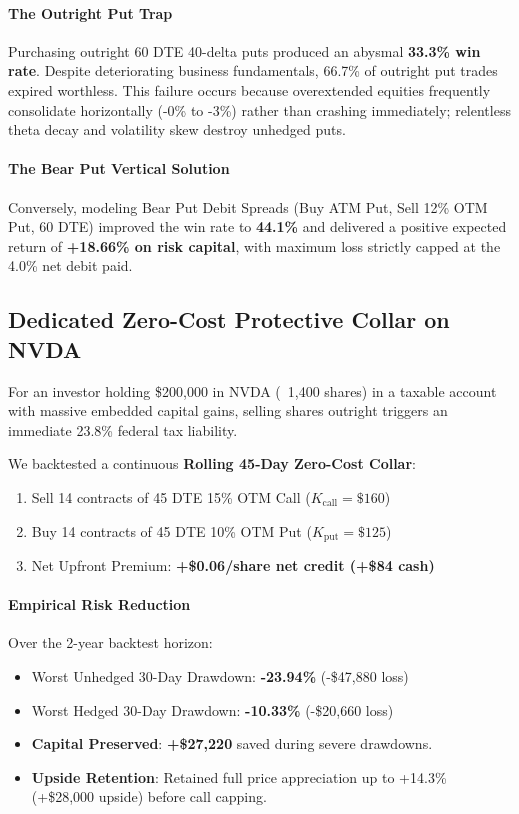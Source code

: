 \documentclass[11pt]{article}
\begin{document}
\paragraph{The Outright Put Trap}
Purchasing outright 60 DTE 40-delta puts produced an abysmal \textbf{33.3\% win rate}. Despite deteriorating business fundamentals, 66.7\% of outright put trades expired worthless. This failure occurs because overextended equities frequently consolidate horizontally (-0\% to -3\%) rather than crashing immediately; relentless theta decay and volatility skew destroy unhedged puts.

\paragraph{The Bear Put Vertical Solution}
Conversely, modeling Bear Put Debit Spreads (Buy ATM Put, Sell 12\% OTM Put, 60 DTE) improved the win rate to \textbf{44.1\%} and delivered a positive expected return of \textbf{+18.66\% on risk capital}, with maximum loss strictly capped at the 4.0\% net debit paid.

\subsection{Dedicated Zero-Cost Protective Collar on NVDA}

For an investor holding \$200,000 in NVDA (~1,400 shares) in a taxable account with massive embedded capital gains, selling shares outright triggers an immediate 23.8\% federal tax liability.

We backtested a continuous \textbf{Rolling 45-Day Zero-Cost Collar}:
\begin{enumerate}
    \item Sell 14 contracts of 45 DTE 15\% OTM Call ($K_{\text{call}} = \$160$)
    \item Buy 14 contracts of 45 DTE 10\% OTM Put ($K_{\text{put}} = \$125$)
    \item Net Upfront Premium: \textbf{+\$0.06/share net credit (+\$84 cash)}
\end{enumerate}

\paragraph{Empirical Risk Reduction}
Over the 2-year backtest horizon:
\begin{itemize}
    \item Worst Unhedged 30-Day Drawdown: \textbf{-23.94\%} (-\$47,880 loss)
    \item Worst Hedged 30-Day Drawdown: \textbf{-10.33\%} (-\$20,660 loss)
    \item \textbf{Capital Preserved}: \textbf{+\$27,220} saved during severe drawdowns.
    \item \textbf{Upside Retention}: Retained full price appreciation up to +14.3\% (+\$28,000 upside) before call capping.
\end{itemize}
\end{document}
